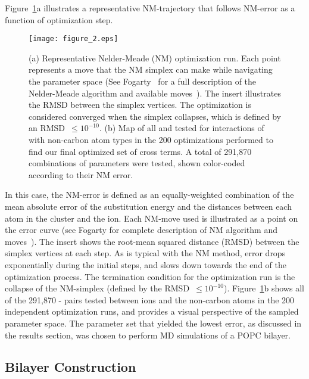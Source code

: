 Figure~\ref{figch2:nmerror}a illustrates a representative
NM-trajectory that follows NM-error as a function of optimization step. 
\begin{figure}[H]
    \texttt{[image: figure\_2.eps]}
    \caption[Representative Nelder-Meade (NM) optimization run.]{(a) Representative Nelder-Meade (NM) optimization run. Each point
    represents a move that the NM simplex can make while navigating the parameter space 
    (See Fogarty \etal~for a full description of the
    Nelder-Meade algorithm and available moves~\cite{fogarty:2014:paropt}). The insert illustrates the 
    RMSD between the simplex vertices.
    The optimization is considered converged when the simplex collapses, which is defined by an RMSD~$\leq 10^{-10}$.
    (b) Map of all \sigmaij{} and \epsilonij{} tested for interactions of \na{} with non-carbon atom types 
    in the 200 optimizations performed to find our final optimized set of cross terms. A total of
291,870 combinations of parameters were tested, shown color-coded according to their NM error.}
    \label{figch2:nmerror}
\end{figure}
In this case, the NM-error is
defined as an
equally-weighted combination of the mean absolute error of the
substitution energy and the distances between each atom in the cluster and the \na{} ion. 
Each NM-move used is illustrated
as a point on the error curve 
(see Fogarty \etal{} for complete description of NM algorithm and
moves~\cite{fogarty:2014:paropt}).
The insert shows the root-mean squared distance (RMSD) between the simplex vertices at each step. 
As is typical with the NM method, error drops exponentially during the
initial steps, and slows down towards the end of the optimization
process. The termination condition for the optimization run is the
collapse of the NM-simplex (defined by the RMSD~$\leq 10^{-10}$).
Figure~\ref{figch2:nmerror}b shows all of the 291,870 \sigmaij{}-\epsilonij{} pairs tested 
between \na{} ions and the non-carbon atoms in the 200 independent optimization runs,
and provides a visual perspective of the sampled parameter space.
The parameter set that yielded the lowest error, as discussed in the results section, was
chosen to perform MD simulations of a POPC bilayer.

\subsection{Bilayer Construction}

